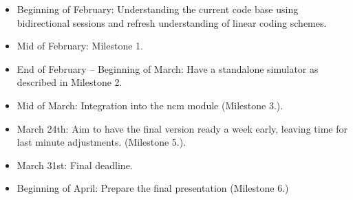 \documentclass[a4paper, 11pt]{article}
\begin{document}
    \begin{itemize}
        \item Beginning of February: Understanding the current code base using bidirectional sessions and refresh understanding of linear coding schemes.
        \item Mid of February: Milestone 1.
        \item End of February -- Beginning of March: Have a standalone simulator as described in Milestone 2.
        \item Mid of March: Integration into the ncm module (Milestone 3.).
        \item March 24th: Aim to have the final version ready a week early,
            leaving time for last minute adjustments. (Milestone 5.).
        \item March 31st: Final deadline.
        \item Beginning of April: Prepare the final presentation (Milestone 6.)
    \end{itemize}
\end{document}
